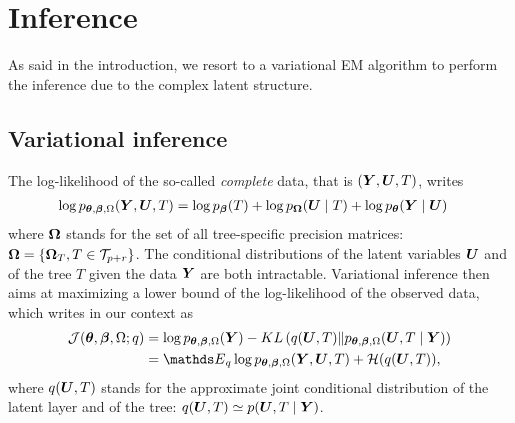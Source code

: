 \section{Inference} \label{sec:Inference}

As said in the introduction, we  resort to a variational EM algorithm to perform the inference due to the complex latent structure.

\subsection{Variational inference}

The log-likelihood of the so-called {\sl complete} data, that is $({\boldsymbol{Y}}, {\boldsymbol{U}}, T)$, writes
\begin{align*}
\log p_{{\boldsymbol{\theta}}, {\boldsymbol{\beta}}, \Omega}({\boldsymbol{Y}}, {\boldsymbol{U}}, T) 
& = \log p_{\boldsymbol{\beta}}(T) + \log p_{{\boldsymbol{\Omega}}}({\boldsymbol{U}} \mid T) + \log p_{\boldsymbol{\theta}}({\boldsymbol{Y}} \mid {\boldsymbol{U}})
\end{align*}
where ${\boldsymbol{\Omega}}$ stands for the set of all tree-specific precision matrices: ${\boldsymbol{\Omega}} = \{{\boldsymbol{\Omega}}_T, T \in {\mathcal{T}}_{p+r}\}$.
The conditional distributions of the latent variables ${\boldsymbol{U}}$ and of the tree $T$ given the data ${\boldsymbol{Y}}$ are both intractable. Variational inference then aims at maximizing a lower bound of the log-likelihood of the observed data, which writes in our context as
\begin{align} \label{eq:lower-bound}
\Jcal(\thetabf, \betabf, \Omega; q)
& = \log p_{\thetabf, \betabf, \Omega}(\Ybf) 
- KL\left(q(\Ubf, T) \| p_{\thetabf, \betabf, \Omega}(\Ubf, T \mid \Ybf) \right) \\
& = \Esp_q \log p_{\thetabf, \betabf, \Omega}(\Ybf,\Ubf, T) + \Hcal(q(\Ubf, T)), \nonumber
\end{align}
where $q({\boldsymbol{U}},T)$ stands for the approximate joint conditional distribution of the latent layer and of the tree: $q({\boldsymbol{U}}, T) \simeq p({\boldsymbol{U}}, T \mid {\boldsymbol{Y}})$. 


